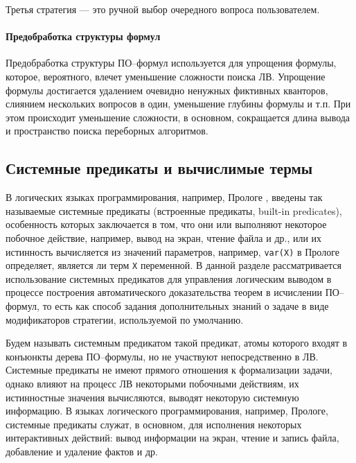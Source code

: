 Третья стратегия --- это ручной выбор очередного вопроса пользователем.

\paragraph{Предобработка структуры формул}
Предобработка структуры ПО--формул используется для упрощения формулы, которое, вероятного, влечет уменьшение сложности поиска ЛВ. Упрощение формулы достигается удалением очевидно ненужных фиктивных кванторов, слиянием нескольких вопросов в один, уменьшение глубины формулы и т.п. При этом происходит уменьшение сложности, в основном, сокращается длина вывода и пространство поиска переборных алгоритмов.


\subsection{Системные предикаты и вычислимые термы}
В логических языках программирования, например, Прологе \cite{Bratko}, введены так называемые системные предикаты (встроенные предикаты, built-in predicates), особенность которых заключается в том, что они или выполняют некоторое побочное действие, например, вывод на экран, чтение файла и др., или их истинность вычисляется из значений параметров, например, \texttt{var(X)} в Прологе определяет, является ли терм \texttt{X} переменной. В данной разделе рассматривается использование системных предикатов для управления логическим выводом в процессе построения автоматического доказательства теорем в исчислении ПО--формул, то есть как способ задания дополнительных знаний о задаче в виде модификаторов стратегии, используемой по умолчанию.

Будем называть системным предикатом такой предикат, атомы которого входят в конъюнкты дерева ПО--формулы, но не участвуют непосредственно в ЛВ. Системные предикаты не имеют прямого отношения к формализации задачи, однако влияют на процесс ЛВ некоторыми побочными действиям, их истинностные значения вычисляются, выводят некоторую системную информацию. В языках логического программирования, например, Прологе, системные предикаты служат, в основном, для исполнения некоторых интерактивных действий: вывод информации на экран, чтение и запись файла, добавление и удаление фактов и др.

